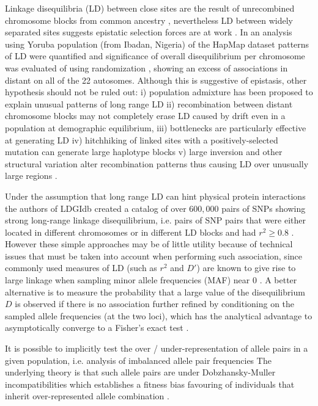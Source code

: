 Linkage disequilibria (LD) between close sites are the result of unrecombined chromosome blocks from common ancestry \cite{REF}, nevertheless LD between widely separated sites suggests epistatic selection forces are at work \cite{REF-FISHER, REF-NATURE, koch2013long}.
In an analysis using Yoruba population (from Ibadan, Nigeria) of the HapMap dataset patterns of LD were quantified and significance of overall disequilibrium per chromosome was evaluated of using randomization \cite{koch2013long}, showing an excess of associations in distant on all of the 22 autosomes. 
Although this is suggestive of epistasis, other hypothesis should not be ruled out:
i) population admixture has been proposed to explain unusual patterns of long range LD \cite{koch2013long:REF}
ii) recombination between distant chromosome blocks may not completely erase LD caused by drift even in a population at demographic equilibrium, 
iii) bottlenecks are particularly effective at generating LD
iv) hitchhiking of linked sites with a positively-selected mutation can generate large haplotype blocks 
v) large inversion and other structural variation alter recombination patterns thus causing LD over unusually large regions \cite{koch2013long:REF}.

Under the assumption that long range LD can hint physical protein interactions the authors of LDGIdb \cite{wang2012ldgidb} created a catalog of over $600,000$ pairs of SNPs showing strong long-range linkage disequilibrium, i.e. pairs of SNP pairs that were either located in different chromosomes or in different LD blocks and had $r^2 \ge 0.8$ \cite{wang2012ldgidb}.
However these simple approaches may be of little utility because of technical issues that must be taken into account when performing such association, since commonly used measures of LD (such as $r^2$ and $D'$) are known to give rise to large linkage when sampling minor allele frequencies (MAF) near 0 \cite{koch2013long}.
A better alternative is to measure the probability that a large value of the disequilibrium $D$ is observed if there is no association further refined by conditioning on the sampled allele frequencies (at the two loci), which has the analytical advantage to asymptotically converge to a Fisher's exact test \cite{koch2013long}.

It is possible to implicitly test the over / under-representation of allele pairs in a given population, i.e. analysis of imbalanced allele pair frequencies \cite{ackermann2012systematic}
The underlying theory is that such allele pairs are under Dobzhansky-Muller incompatibilities which establishes a fitness bias favouring of individuals that inherit over-represented allele combination \cite{ackermann2012systematic}.

